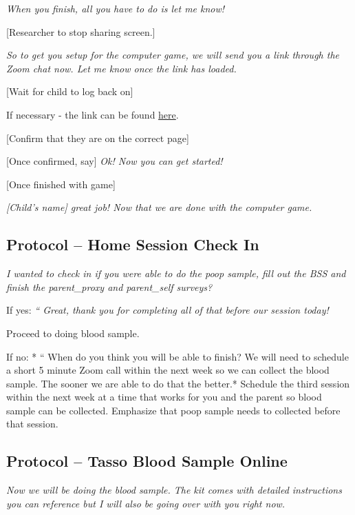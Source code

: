 \documentclass[]{book}
\begin{document}
\emph{When you finish, all you have to do is let me know!}

{[}Researcher to stop sharing screen.{]}

\emph{So to get you setup for the computer game, we will send you a link through the Zoom chat now. Let me know once the link has loaded.}

{[}Wait for child to log back on{]}

If necessary - the link can be found \href{https://research.sc/participant/login/20451/publicid}{here}.

{[}Confirm that they are on the correct page{]}

{[}Once confirmed, say{]} \emph{Ok! Now you can get started!}

{[}Once finished with game{]}

\emph{{[}Child's name{]} great job! Now that we are done with the computer game.}

\hypertarget{protocol-home-session-check-in}{%
\subsection{Protocol -- Home Session Check In}\label{protocol-home-session-check-in}}

\emph{I wanted to check in if you were able to do the poop sample, fill out the BSS and finish the parent\_proxy and parent\_self surveys?}

If yes: \emph{`` Great, thank you for completing all of that before our session today!}

Proceed to doing blood sample.

If no: * `` When do you think you will be able to finish? We will need to schedule a short 5 minute Zoom call within the next week so we can collect the blood sample. The sooner we are able to do that the better.* Schedule the third session within the next week at a time that works for you and the parent so blood sample can be collected. Emphasize that poop sample needs to collected before that session.

\hypertarget{protocol-tasso-blood-sample-online}{%
\subsection{Protocol -- Tasso Blood Sample Online}\label{protocol-tasso-blood-sample-online}}

\emph{Now we will be doing the blood sample. The kit comes with detailed instructions you can reference but I will also be going over with you right now. }
\end{document}
